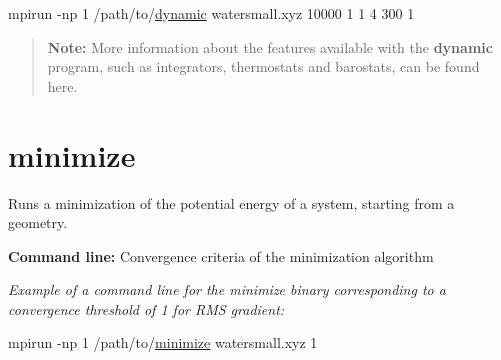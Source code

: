 \begin{DoxyCode}
mpirun -np 1 /path/to/\hyperlink{dynamic_8f90_a242c646ad028ae81e8a4bed2193eae5d}{dynamic} watersmall.xyz 10000 1 1 4 300 1
\end{DoxyCode}


\begin{quotation}
{\bfseries Note\-:} More information about the features available with the {\bfseries dynamic} program, such as integrators, thermostats and barostats, can be found here.

\end{quotation}
\hypertarget{tinker_hp_suite_program_minimize}{}\section{minimize}\label{tinker_hp_suite_program_minimize}
Runs a minimization of the potential energy of a system, starting from a geometry.
\begin{DoxyItemize}
\item {\bfseries Command line\-:} Convergence criteria of the minimization algorithm
\end{DoxyItemize}

{\itshape Example of a command line for the minimize binary corresponding to a convergence threshold of 1 for R\-M\-S gradient\-:}


\begin{DoxyCode}
mpirun -np 1 /path/to/\hyperlink{minimize_8f90_a0ea869a84e4dbfc9951ec265abef5b8d}{minimize} watersmall.xyz 1
\end{DoxyCode}


